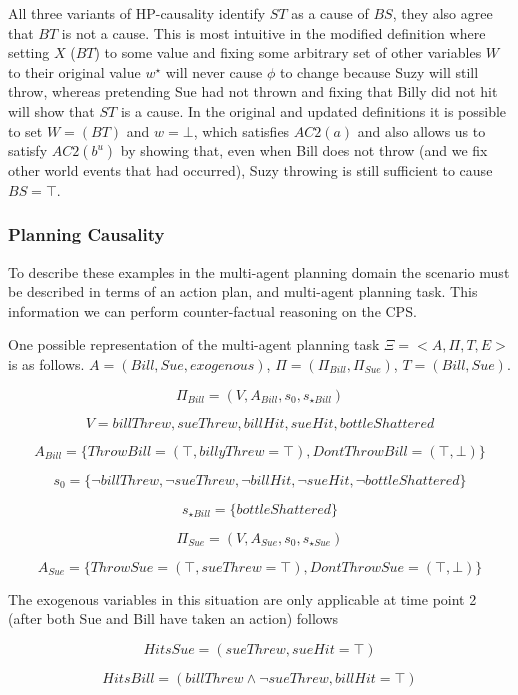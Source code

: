 \documentclass{article}
\theoremstyle{plain}
\theoremstyle{definition}
\begin{document}
All three variants of HP-causality identify $ST$ as a cause of $BS$, they also agree that $BT$ is not a cause. This is most intuitive in the modified definition where setting $X$ ($BT$) to some value and fixing some arbitrary set of other variables $W$ to their original value $w^\star$ will never cause $\phi$ to change because Suzy will still throw, whereas pretending Sue had not thrown and fixing that Billy did not hit will show that $ST$ is a cause. In the original and updated definitions it is possible to set $W=(BT)$ and $w=\bot$, which satisfies $AC2(a)$ and also allows us to satisfy $AC2(b^u)$ by showing that, even when Bill does not throw (and we fix other world events that had occurred), Suzy throwing is still sufficient to cause $BS=\top$. 


\subsubsection*{Planning Causality}
To describe these examples in the multi-agent planning domain the scenario must be described in terms of an action plan, and multi-agent planning task. This information we can perform counter-factual reasoning on the CPS.

One possible representation of the multi-agent planning task $\Xi=<A, \Pi, T, E>$ is as follows. $A=(Bill, Sue, exogenous)$, $\Pi=(\Pi_{Bill},\Pi_{Sue})$, $T= (Bill, Sue)$. 

\[
\Pi_{Bill}=(V, A_{Bill}, s_0, s_{\star Bill})
\]

\[
V = {billThrew, sueThrew, billHit, sueHit, bottleShattered}
\]

\[
A_{Bill}=\{ThrowBill = (\top, billyThrew = \top), {DontThrowBill=(\top, \bot)} \}
\]

\[
s_0 = \{\lnot billThrew, \lnot sueThrew, \lnot billHit, \lnot sueHit, \lnot bottleShattered \}
\]

\[ s_{\star Bill} = \{bottleShattered\} \]

\[
\Pi_{Sue}=(V, A_{Sue}, s_0, s_{\star Sue})
\]

\[
A_{Sue}=\{ThrowSue = (\top, sueThrew = \top), {DontThrowSue=(\top, \bot)} \}
\]

The exogenous variables in this situation are only applicable at time point 2 (after both Sue and Bill have taken an action) follows

\[
HitsSue = (sueThrew, sueHit = \top)
\]

\[
HitsBill = (billThrew \land \lnot sueThrew, billHit = \top)
\]
\end{document}
